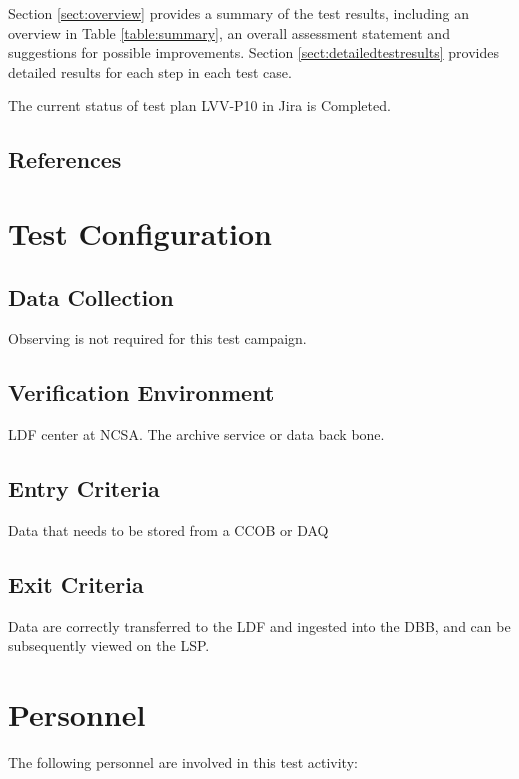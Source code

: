 \documentclass[DM,lsstdraft,STR,toc]{lsstdoc}
\begin{document}
Section \ref{sect:overview} provides a summary of the test results, including an overview in Table \ref{table:summary}, an overall assessment statement and suggestions for possible improvements.
Section \ref{sect:detailedtestresults} provides detailed results for each step in each test case.

The current status of test plan LVV-P10 in Jira is Completed.

\subsection{References}
\label{sect:references}
\renewcommand{\refname}{}

\section{Test Configuration}
\label{sect:configuration}

\subsection{Data Collection}

  Observing is not required for this test campaign.

\subsection{Verification Environment}
\label{sect:hwconf}
  LDF center at NCSA. The archive service or data back bone.


  \subsection{Entry Criteria}
  Data that needs to be stored from a CCOB or DAQ


  \subsection{Exit Criteria}
  Data are correctly transferred to the LDF and ingested into the DBB, and
can be subsequently viewed on the LSP.



\section{Personnel}
\label{sect:personnel}

The following personnel are involved in this test activity:
\end{document}
